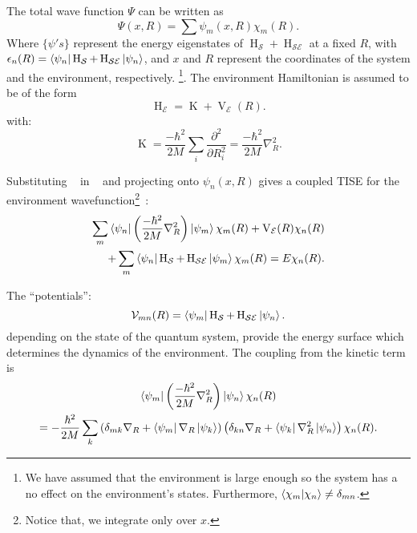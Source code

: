 The total wave function $\Psi$ can be written as
\begin{equation}
    \label{eqn:chap2_total_wavefunction}
    \Psi(x, R) = \sum  \psi_m (x, R) \chi_m(R).
\end{equation}
Where \(\{\psi 's\}\) represent the energy eigenstates of \(\operatorname{H}_{\mathcal{S}} + \operatorname{H}_{\mathcal{SE}}\) at a fixed $R$, with \\ \(\epsilon_n (R) =  \bra{\psi_n}\operatorname{H}_{\mathcal{S}} + \operatorname{H}_{\mathcal{SE}}\ket{\psi_n}\), and $x$ and $R$ represent the coordinates of the system and the environment, respectively.
\footnote{We have assumed that the environment is large enough so the system  has a 
no effect on the environment's states. Furthermore, \(\braket{\chi_m}{\chi_n} \not = \delta_{mn}\).}. 
The environment Hamiltonian is assumed to be of the form
\begin{equation}
    \label{eqn:chap2_env_hamiltonian}
    \operatorname{H}_{\mathcal{E}} = \operatorname{K} + \operatorname{V}_{\mathcal{E}} (R).
\end{equation}
with:
\begin{equation}
    \operatorname{K} = \frac{-\hbar^2}{2M} \sum_i \frac{\partial^2}{\partial R_i^2} = \frac{-\hbar^2}{2M} 
    \nabla _R^2.
\end{equation}

Substituting ~ in ~ and projecting onto
$\psi_n(x, R)$ gives a coupled TISE for the environment wavefunction\footnote{Notice 
that, we integrate only over $x$.}~\cite{briggs2001derivation}:
\begin{equation}
    \label{eqn:chap2_TISE_proj}
    \begin{aligned}
        \sum_{m} \bra{\psi_n} \left(\frac{-\hbar^2}{2M} \nabla_R^2 \right) \ket{\psi_m} \chi_m(R) 
    + \operatorname{V}_{\mathcal{E}}(R) \chi_n(R)\\
    + \sum_{m} \bra{\psi_n} \operatorname{H}_{\mathcal{S}} + \operatorname{H}_{\mathcal{SE}}\ket{\psi_m}\chi_m(R) = E \chi_n(R).
    \end{aligned}
\end{equation}

The ``potentials'':
\begin{equation}
    \mathcal{V}_{mn}(R) = \bra{\psi_m} \operatorname{H}_{\mathcal{S}} + \operatorname{H}_{\mathcal{SE}}
    \ket{\psi_n}.
\end{equation}
depending on the state of the quantum system, provide the energy surface
which determines the dynamics of the environment. The coupling from the kinetic term is
\begin{equation}
    \begin{gathered}
        \bra{\psi_m} \left(\frac{-\hbar^2}{2M} 
        \nabla_R^2 \right) \ket{\psi_n} \chi_n(R) \\
        = -\frac{\hbar^2}{2M} \sum_k \left(\delta_{mk} \nabla_R+ \bra{\psi_m}\nabla_R
    \ket{\psi_k}\right)\left(\delta_{kn} \nabla_R+ \bra{\psi_k}\nabla_R^2\ket{\psi_n}\right)
     \chi_n(R).
    \end{gathered}
\end{equation}

